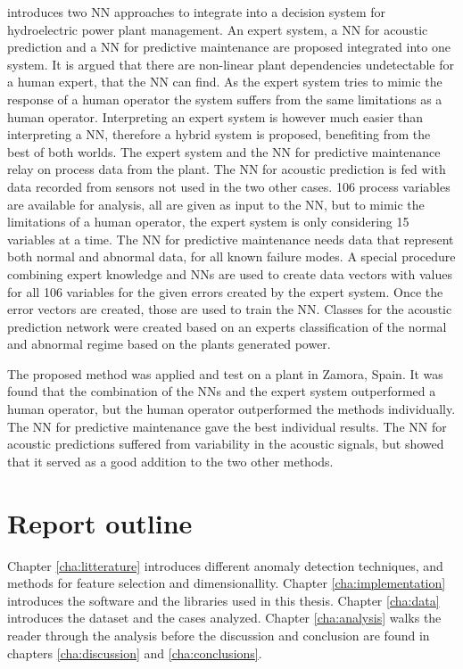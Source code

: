         \cite{Molina2000} introduces two NN approaches to integrate into a decision system for hydroelectric power plant management. An expert system, a NN for acoustic prediction and a NN for predictive maintenance are proposed integrated into one system. It is argued that there are non-linear plant dependencies undetectable for a human expert, that the NN can find. As the expert system tries to mimic the response of a human operator the system suffers from the same limitations as a human operator. Interpreting an expert system is however much easier than interpreting a NN, therefore a hybrid system is proposed, benefiting from the best of both worlds. The expert system and the NN for predictive maintenance relay on process data from the plant. The NN for acoustic prediction is fed with data recorded from sensors not used in the two other cases. 106 process variables are available for analysis, all are given as input to the NN, but to mimic the limitations of a human operator, the expert system is only considering 15 variables at a time. The NN for predictive maintenance needs data that represent both normal and abnormal data, for all known failure modes. A special procedure combining expert knowledge and NNs are used to create data vectors with values for all 106 variables for the given errors created by the expert system. Once the error vectors are created, those are used to train the NN. Classes for the acoustic prediction network were created based on an experts classification of the normal and abnormal regime based on the plants generated power. 
        
        The proposed method was applied and test on a plant in Zamora, Spain. It was found that the combination of the NNs and the expert system outperformed a human operator, but the human operator outperformed the methods individually. The NN for predictive maintenance gave the best individual results. The NN for acoustic predictions suffered from variability in the acoustic signals, but showed that it served as a good addition to the two other methods. 
        
        
    
    
    
    \section{Report outline}
    Chapter \ref{cha:litterature} introduces different anomaly detection techniques, and methods for feature selection and dimensionallity. Chapter \ref{cha:implementation} introduces the software and the libraries used in this thesis. Chapter \ref{cha:data} introduces the dataset and the cases analyzed. Chapter \ref{cha:analysis} walks the reader through the analysis before the discussion and conclusion are found in chapters  \ref{cha:discussion} and \ref{cha:conclusions}.  

